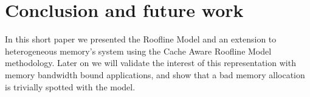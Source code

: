 \documentclass[twoside,twocolumn,8pt]{extarticle}
\begin{document}
\section{Conclusion and future work}\label{sec:conclusion}
In this short paper we presented the Roofline Model and an extension to heterogeneous memory's system using the Cache Aware
Roofline Model methodology. Later on we will validate the interest of this representation with memory bandwidth bound applications, and show that a bad memory allocation is trivially spotted with the model. 



\end{document}
